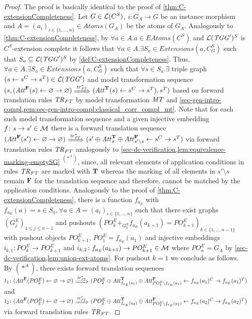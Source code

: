 \begin{proof}
The proof is basically identical to the proof of \cref{thm:C-extensionCompleteness}.
Let $G \in \mathcal{L}(C^S)$, $i\colon G_A \to G$ be an instance morphism and $A=(a_i)_{i \in \{1,\ldots,n\}} \in Atoms(G_A)$ be the atoms of $G_A$.
Analogously to \cref{thm:C-extensionCompleteness}, by $\forall a \in A.a \in EAtoms(C^S)$ and $\mathcal{L}(\mathit{TGG}')^S$ is $C^S$-extension complete it follows that $\forall a \in A.\exists S_a \in Extensions(a,C^S_G)$ such that $S_a \subseteq \mathcal{L}(\mathit{TGG}')^S$ by \cref{def:C-extensionCompleteness}.
Thus, $\forall a \in A.\exists S_a \in Extensions(a,C^S_G)$ such that $\forall s \in S_a.\exists$ triple graph $(s \gets s^C \to s^T) \in \mathcal{L}(\mathit{TGG}')$ and model transformation sequence $(s,(\Att^\False(s) \gets \varnothing \to \varnothing) \Trans{\tr_\FT^*} (\Att^\True(s) \gets s^C \to s^T),s^T)$ based on forward translation rules $\mathit{TR}_\mathit{FT}$ by model transformation $\mathit{MT}$ and \cref{sec-gen-intro-compl,rem:sec-gen-intro-compl:classical_corr_compl_mt}.
Note that for each such model transformation sequence and a given injective embedding $f\colon s \to s' \in {\cal M}$ there is a forward translation sequence $(\Att^\False(s') \gets \varnothing \to \varnothing) \Trans{\tr_\FT^*} (s' \oplus \Att^\True_{s} \oplus \Att^\False_{s' \setminus s} \gets s^C \to s^T)$ via forward translation rules $\mathit{TR}_\mathit{FT}$ analogously to \cref{sec-dc-verification,lem:equivalence-marking-emptySG} $^{(*^A)}$, since, all relevant elements of application conditions in rules $\mathit{TR}_\mathit{FT}$ are marked with $\mathbf{T}$ whereas the marking of all elements in $s' \setminus s$ remain $\mathbf{F}$ for the translation sequence and therefore, cannot be matched by the application conditions.
Analogously to the proof of \cref{thm:C-extensionCompleteness}, there is a function $f_{a_E}$ with $f_{a_E}(a)=s \in S_a,\forall a \in A=(a_i)_{i \in \{1,\ldots,n\}}$ such that there exist graphs $(G^E_j)_{1 \leq j \leq n-1}$ and pushouts $(PO^E_k +_{G^E_k} f_{a_E}(a_{k+1})=PO^E_{k+1})_{k \in \{1,\ldots,n-1\}}$ with pushout objects $PO^E_{k+1}$, $PO^E_1=f_{a_E}(a_1)$ and injective embeddings $i_{k,1}\colon PO^E_k \to PO^E_{k+1}$ and $i_{k,2}\colon f_{a_E}(a_{k+1}) \to PO^E_{k+1} \in {\cal M}$ where $PO^E_n=G_A$ by \cref{sec-dc-verification,lem:union-ext-atoms}.
For pushout $k=1$ we conclude as follows.
By $(*^A)$, there exists forward translation sequences $t_1\colon (\Att^\False(PO^E_2) \gets \varnothing \to \varnothing) \Trans{\tr_\FT^*} (PO^E_2 \oplus \Att^\True_{f_{a_E}(a_1)} \oplus \Att^\False_{PO^E_2 \setminus f_{a_E}(a_1)} \gets f_{a_E}(a_1)^C \to f_{a_E}(a_1)^T)$ and $t_2\colon (\Att^\False(PO^E_2) \gets \varnothing \to \varnothing) \Trans{\tr_\FT^*} (PO^E_2 \oplus \Att^\True_{f_{a_E}(a_2)} \oplus \Att^\False_{PO^E_2 \setminus f_{a_E}(a_2)} \gets f_{a_E}(a_2)^C \to f_{a_E}(a_2)^T)$ via forward translation rules $\mathit{TR}_\mathit{FT}$.

\end{proof}
